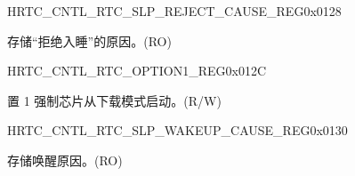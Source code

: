 \begin{register}{H}{RTC\_CNTL\_RTC\_SLP\_REJECT\_CAUSE\_REG}{0x{}0128}\label{regdesc:RTCCNTLRTCSLPREJECTCAUSEREG}
%
%
\regnewline%
\begin{regdesc}\begin{reglist}
\label{fielddesc:RTCCNTLREJECTCAUSE}\item [RTC\_CNTL\_REJECT\_CAUSE] 存储“拒绝入睡”的原因。(RO)
\end{reglist}\end{regdesc}
\end{register}


\begin{register}{H}{RTC\_CNTL\_RTC\_OPTION1\_REG}{0x{}012C}\label{regdesc:RTCCNTLRTCOPTION1REG}
%
%
\regnewline%
\begin{regdesc}\begin{reglist}
\label{fielddesc:RTCCNTLFORCEDOWNLOADBOOT}\item [RTC\_CNTL\_FORCE\_DOWNLOAD\_BOOT] 置 1 强制芯片从下载模式启动。(R/W)
\end{reglist}\end{regdesc}
\end{register}


\begin{register}{H}{RTC\_CNTL\_RTC\_SLP\_WAKEUP\_CAUSE\_REG}{0x{}0130}\label{regdesc:RTCCNTLRTCSLPWAKEUPCAUSEREG}
%
%
\regnewline%
\begin{regdesc}\begin{reglist}
\label{fielddesc:RTCCNTLWAKEUPCAUSE}\item [RTC\_CNTL\_WAKEUP\_CAUSE] 存储唤醒原因。(RO)
\end{reglist}\end{regdesc}
\end{register}



